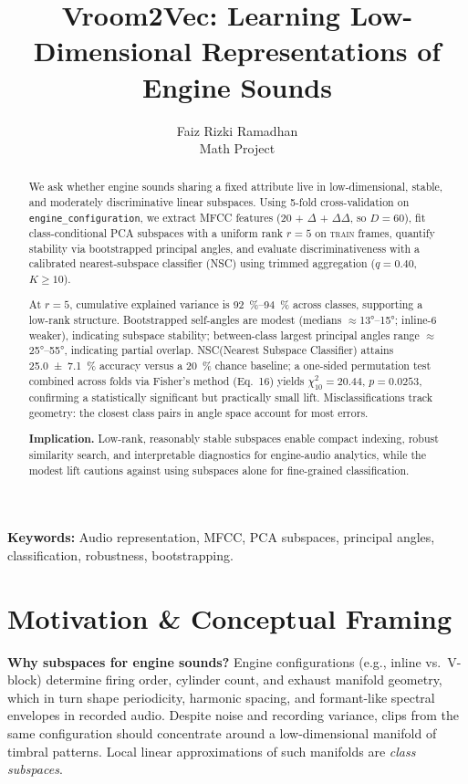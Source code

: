 \documentclass[11pt]{article}
\title{Vroom2Vec: Learning Low-Dimensional Representations of Engine Sounds}
\author{Faiz Rizki Ramadhan \\ \small Math Project}
\date{}
\newcommand{\D}{\ensuremath{D}\xspace}
\newcommand{\rankr}{\ensuremath{r}\xspace}
\newcommand{\NSC}{NSC\xspace}
\begin{document}
\maketitle

\begin{abstract}
We ask whether engine sounds sharing a fixed attribute live in low-dimensional, stable, and moderately discriminative linear subspaces. Using 5-fold cross-validation on \texttt{engine\_configuration}, we extract MFCC features (20 + $\Delta$ + $\Delta\Delta$, so $\D=60$), fit class-conditional PCA subspaces with a uniform rank $\rankr=5$ on \textsc{train} frames, quantify stability via bootstrapped principal angles, and evaluate discriminativeness with a calibrated nearest-subspace classifier (\NSC) using trimmed aggregation ($q=0.40$, $K\!\ge\!10$).

At $\rankr=5$, cumulative explained variance is \SIrange{92}{94}{\percent} across classes, supporting a low-rank structure. Bootstrapped self-angles are modest (medians $\approx$\ang{13}--\ang{15}; inline-6 weaker), indicating subspace stability; between-class largest principal angles range $\approx$\ang{25}--\ang{55}, indicating partial overlap. \NSC (Nearest Subspace Classifier) attains \SI{25.0 \pm 7.1}{\percent} accuracy versus a \SI{20}{\percent} chance baseline; a one-sided permutation test combined across folds via Fisher's method (Eq.~16) yields $\chi^2_{10}=20.44$, $p=0.0253$, confirming a statistically significant but practically small lift. Misclassifications track geometry: the closest class pairs in angle space account for most errors.

\textbf{Implication.} Low-rank, reasonably stable subspaces enable compact indexing, robust similarity search, and interpretable diagnostics for engine-audio analytics, while the modest lift cautions against using subspaces alone for fine-grained classification.
\end{abstract}


\noindent\textbf{Keywords:} Audio representation, MFCC, PCA subspaces, principal angles, classification, robustness, bootstrapping.

\section{Motivation \& Conceptual Framing}

\textbf{Why subspaces for engine sounds?} Engine configurations (e.g., inline vs.\ V-block) determine firing order, cylinder count, and exhaust manifold geometry, which in turn shape periodicity, harmonic spacing, and formant-like spectral envelopes in recorded audio. Despite noise and recording variance, clips from the same configuration should concentrate around a low-dimensional manifold of timbral patterns. Local linear approximations of such manifolds are \emph{class subspaces}.
\end{document}
